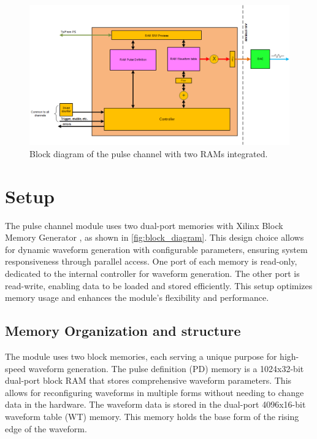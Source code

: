 \begin{figure}[ht]
    \centering
    \includegraphics[width=1.0\linewidth]{figures/3.1.png}
    \caption{Block diagram of the pulse channel with two RAMs integrated.}
    \label{fig:block_diagram}
\end{figure}

\section{Setup}

The pulse channel module uses two dual-port memories with Xilinx Block Memory Generator \cite{blockmemgen}, as shown in \autoref{fig:block_diagram}. This design choice allows for dynamic waveform generation with configurable parameters, ensuring system responsiveness through parallel access. One port of each memory is read-only, dedicated to the internal controller for waveform generation. The other port is read-write, enabling data to be loaded and stored efficiently. This setup optimizes memory usage and enhances the module's flexibility and performance.

\subsection{Memory Organization and structure}

The module uses two block memories, each serving a unique purpose for high-speed waveform generation. The pulse definition (PD) memory is a 1024x32-bit dual-port block RAM that stores comprehensive waveform parameters. This allows for reconfiguring waveforms in multiple forms without needing to change data in the hardware. The waveform data is stored in the dual-port 4096x16-bit waveform table (WT) memory. This memory holds the base form of the rising edge of the waveform.

